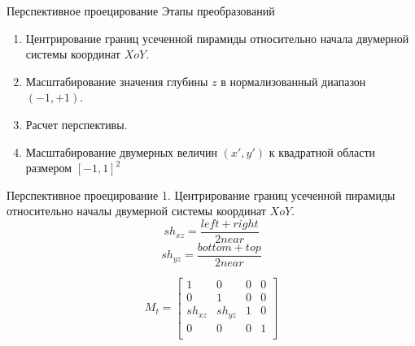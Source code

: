 \documentclass{beamer}
\begin{document}
	\begin{frame}{Перспективное проецирование}
		Этапы преобразований
		\begin{enumerate}
			\item Центрирование границ усеченной пирамиды относительно начала двумерной системы координат $XoY$.
			\item Масштабирование значения глубины $z$ в нормализованный диапазон $(-1, +1)$.
			\item Расчет перспективы.
			\item Масштабирование двумерных величин $(x', y')$ к квадратной области размером $[-1, 1]^2$
			\end{enumerate}


		\end{frame}

	\begin{frame}{Перспективное проецирование}
		1. Центрирование границ усеченной пирамиды относительно началы двумерной системы координат $XoY$.
		\[
			sh_{xz} = \frac{left + right}{2 near}
		\]
		\[
			sh_{yz} = \frac{bottom + top}{2 near}
		\]

		\[
			M_t = 
			\begin{bmatrix}
				1 & 0 & 0 & 0 \\
				0 & 1 & 0 & 0 \\
				sh_{xz} & sh_{yz} & 1 & 0 \\
				0 & 0 & 0 & 1 \\
			\end{bmatrix}	
		\]

	\end{frame}
\end{document}
